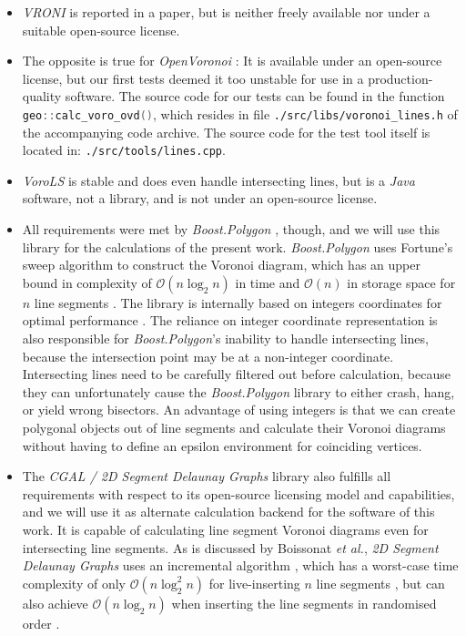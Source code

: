 \begin{itemize}
	\item \textit{VRONI} \cite{Held2001} is reported in a paper, but is neither freely available 
		nor under a suitable open-source license.
	\item The opposite is true for \textit{OpenVoronoi} \cite{web_openvoronoi}: 
		It is available under an open-source license, but our first tests deemed it too unstable 
		for use in a production-quality software. 
		The source code for our tests can be found in the function \lstinline[language=C++]|geo::calc_voro_ovd()|, 
		which resides in file \lstinline|./src/libs/voronoi_lines.h| of the accompanying code archive. 
		The source code for the test tool itself is located in: \lstinline|./src/tools/lines.cpp|.
	\item \textit{VoroLS} \cite{DiplomaSchumann} is stable and does even handle intersecting lines, but is a \textit{Java}
		software, not a library, and is not under an open-source license.
	\item All requirements were met by \textit{Boost.Polygon} \cite{web_boost_polygon}, though, and we will use 
		this library for the calculations of the present work.
		\textit{Boost.Polygon} uses Fortune's sweep algorithm \cite{Fortune1987} to construct
		the Voronoi diagram, which has an upper bound in complexity of $\mathcal{O}\left( n \log_2 n \right)$ in time
		and $\mathcal{O}\left( n \right)$ in storage space for $n$ line segments \cite[p. 168]{Fortune1987}.
		The library is internally based on integers coordinates for optimal performance \cite{web_boost_polygon}.
		The reliance on integer coordinate representation is also responsible for \textit{Boost.Polygon}'s 
		inability to handle intersecting lines, because the intersection point may be at a non-integer coordinate. 
		Intersecting lines need to be carefully filtered out before calculation, because they can unfortunately cause the 
		\textit{Boost.Polygon} library to either crash, hang, or yield wrong bisectors.
		An advantage of using integers is that we can create polygonal objects out of line segments and calculate
		their Voronoi diagrams without having to define an epsilon environment for coinciding vertices.
	\item The \textit{CGAL / 2D Segment Delaunay Graphs} library \cite{web_2dsegdel, Karavelas2004, Karavelas2006}
		also fulfills all requirements with respect to its open-source licensing model and capabilities,
		and we will use it as alternate calculation backend for the software of this work.
		It is capable of calculating line segment Voronoi diagrams even for intersecting line segments.
		As is discussed by Boissonat \textit{et al.}, \textit{2D Segment Delaunay Graphs} uses an incremental
		algorithm \cite[pp. 114-115]{Boissonnat2006}, which has a worst-case time complexity of only
		$\mathcal{O}\left( n \log_2^2 n \right)$ for live-inserting $n$ line segments \cite[p. 104]{Boissonnat2006}, 
		but can also achieve $\mathcal{O}\left( n \log_2 n \right)$ when inserting the line segments in randomised 
		order \cite[p. 105]{Boissonnat2006}.
\end{itemize}


